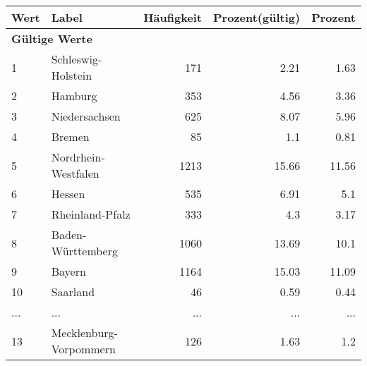      \begin{longtable}{lXrrr}
     \toprule
     \textbf{Wert} & \textbf{Label} & \textbf{Häufigkeit} & \textbf{Prozent(gültig)} & \textbf{Prozent} \\
     \endhead
     \midrule
     \multicolumn{5}{l}{\textbf{Gültige Werte}}\\
        1 & \multicolumn{1}{X}{Schleswig-Holstein} & %
          \num{171} &
          \num[round-mode=places,round-precision=2]{2.21} &
          \num[round-mode=places,round-precision=2]{1.63} \\
        2 & \multicolumn{1}{X}{Hamburg} & %
          \num{353} &
          \num[round-mode=places,round-precision=2]{4.56} &
          \num[round-mode=places,round-precision=2]{3.36} \\
        3 & \multicolumn{1}{X}{Niedersachsen} & %
          \num{625} &
          \num[round-mode=places,round-precision=2]{8.07} &
          \num[round-mode=places,round-precision=2]{5.96} \\
        4 & \multicolumn{1}{X}{Bremen} & %
          \num{85} &
          \num[round-mode=places,round-precision=2]{1.1} &
          \num[round-mode=places,round-precision=2]{0.81} \\
        5 & \multicolumn{1}{X}{Nordrhein-Westfalen} & %
          \num{1213} &
          \num[round-mode=places,round-precision=2]{15.66} &
          \num[round-mode=places,round-precision=2]{11.56} \\
        6 & \multicolumn{1}{X}{Hessen} & %
          \num{535} &
          \num[round-mode=places,round-precision=2]{6.91} &
          \num[round-mode=places,round-precision=2]{5.1} \\
        7 & \multicolumn{1}{X}{Rheinland-Pfalz} & %
          \num{333} &
          \num[round-mode=places,round-precision=2]{4.3} &
          \num[round-mode=places,round-precision=2]{3.17} \\
        8 & \multicolumn{1}{X}{Baden-Württemberg} & %
          \num{1060} &
          \num[round-mode=places,round-precision=2]{13.69} &
          \num[round-mode=places,round-precision=2]{10.1} \\
        9 & \multicolumn{1}{X}{Bayern} & %
          \num{1164} &
          \num[round-mode=places,round-precision=2]{15.03} &
          \num[round-mode=places,round-precision=2]{11.09} \\
        10 & \multicolumn{1}{X}{Saarland} & %
          \num{46} &
          \num[round-mode=places,round-precision=2]{0.59} &
          \num[round-mode=places,round-precision=2]{0.44} \\
       ... & ... & ... & ... & ... \\
        13 & \multicolumn{1}{X}{Mecklenburg-Vorpommern} & %
          \num{126} &
          \num[round-mode=places,round-precision=2]{1.63} &
          \num[round-mode=places,round-precision=2]{1.2} \\


\end{longtable}
